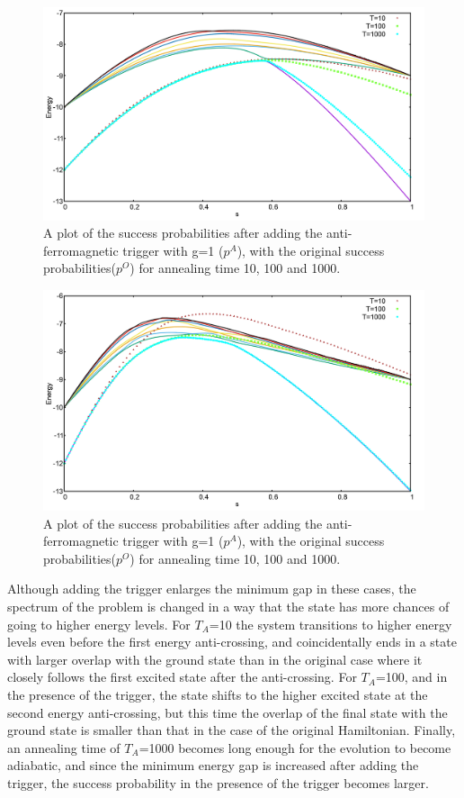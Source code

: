 \documentclass[12]{article}
\begin{document}
\begin{figure}[H]
\centering 
\includegraphics[scale=0.3]{705_O_T.png}
\caption{A plot of the success probabilities after adding the anti-ferromagnetic trigger with g=1 ($p^A$), with the original success probabilities($p^O$) for annealing time 10, 100 and 1000.}
\label{fig:a24}
\end{figure}
\begin{figure}[H]
\centering 
\includegraphics[scale=0.3]{705_A_T_g1.png}
\caption{A plot of the success probabilities after adding the anti-ferromagnetic trigger with g=1 ($p^A$), with the original success probabilities($p^O$) for annealing time 10, 100 and 1000.}
\label{fig:a25}
\end{figure}
Although adding the trigger enlarges the minimum gap in these cases, the spectrum of the problem is changed in a way that the state has more chances of going to higher energy levels. For $T_A$=10 the system transitions to higher energy levels even before the first energy anti-crossing, and coincidentally ends in a state with larger overlap with the ground state than in the original case where it closely follows the first excited state after the anti-crossing. For $T_A$=100, and in the presence of the trigger, the state shifts to the higher excited state at the second energy anti-crossing, but this time the overlap of the final state with the ground state is smaller than that in the case of the original Hamiltonian. Finally, an annealing time of $T_A$=1000 becomes long enough for the evolution to become adiabatic, and since the minimum energy gap is increased after adding the trigger, the success probability in the presence of the trigger becomes larger.\\
\end{document}
